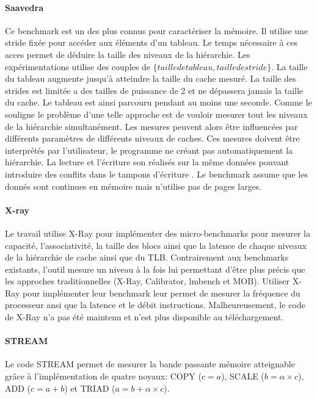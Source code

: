 \paragraph{Saavedra} Ce benchmark est un des plus connus pour caractériser la mémoire. Il utilise une stride fixée pour accéder aux éléments d'un tableau. Le temps nécessaire à ces acces permet de déduire la taille des niveaux de la hiérarchie. Les expérimentations utilise des couples de $\{taille de tableau, taille de stride\}$. La taille du tableau augmente jusqu'à atteindre la taille du cache mesuré. La taille des strides est limitée a des tailles de puissance de 2 et ne dépassera jamais la taille du cache. Le tableau est ainsi parcouru pendant au moins une seconde. Comme le souligne \cite{Yotov2005} le problème d'une telle approche est de vouloir mesurer tout les niveaux de la hiérarchie simultanément. Les mesures peuvent alors être influencées par différents paramètres de différents niveaux de caches. Ces mesures doivent être interprétés par l'utilisateur, le programme ne créant pas automatiquement la hiérarchie. La lecture et l'écriture son réalisés sur la même données pouvant introduire des conflits dans le tampons d'écriture  \cite{Yotov2005}. Le benchmark assume que les donnés sont continues en mémoire mais n'utilise pas de pages larges.


\paragraph{X-ray}
Le travail \cite{Yotov2005} utilise X-Ray pour implémenter des micro-benchmarks pour mesurer la capacité, l'associativité, la taille des blocs ainsi que la latence de chaque niveaux de la hiérarchie de cache ainsi que du TLB. Contrairement aux benchmarks existants, l'outil mesure un niveau à la fois lui permettant d'être plus précis que les approches traditionnelles (X-Ray, Calibrator, lmbench et MOB). Utiliser X-Ray pour implémenter leur benchmark leur permet de mesurer la fréquence du processeur ansi que la latence et le débit instructions. Malheureusement, le code de X-Ray n'a pas été maintenu et n'est plus disponible au téléchargement.


\paragraph{STREAM} Le code STREAM permet de mesurer la bande passante mémoire atteignable grâce à l'implémentation de quatre noyaux: COPY ($c=a$), SCALE ($b=\alpha \times c$), ADD ($c=a+b$) et TRIAD ($a=b+\alpha \times c$).


